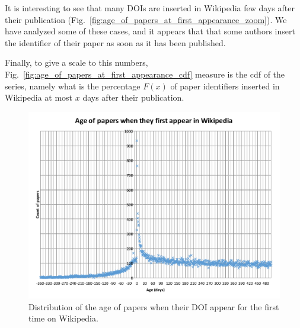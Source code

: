 It is interesting to see that many \acp{DOI} are inserted in Wikipedia few days after their publication (Fig.~\ref{fig:age_of_papers_at_first_appearance_zoom}).
We have analyzed some of these cases, and it appears that that some authors insert the identifier of their paper as soon as it has been published.

Finally, to give a scale to this numbers, Fig.~\ref{fig:age_of_papers_at_first_appearance_cdf} measure is the \ac{cdf} of the series, namely what is the percentage $F(x)$ of paper identifiers inserted in Wikipedia at most $x$ days after their publication.


\begin{figure}[h]
\centering
\includegraphics[keepaspectratio=true, width=\textwidth]{assets/age_of_papers_at_first_appearance}
\caption{Distribution of the age of papers when their DOI appear for the first time on Wikipedia.}
\label{fig:age_of_papers_at_first_appearance}
\end{figure}

